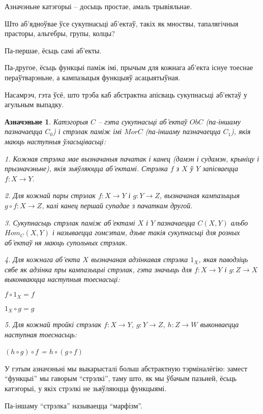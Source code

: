 \documentclass[a4paper,12pt]{book}
\newtheorem{definition}{Азначэньне}[section]
\begin{document}
Азначэньне катэгорыі -- досыць простае, амаль трывіяльнае.

Што аб'ядноўвае ўсе сукупнасьці аб'ектаў, такіх як мноствы,
тапалягічныя прасторы, альгебры, групы, колцы?

Па-першае, ёсьць самі аб'екты.

Па-другое, ёсьць функцыі паміж імі, прычым для кожнага аб'екта існуе
тоеснае пераўтварэньне, а кампазыцыя функцыяў асацыятыўная.

Насамрэч, гэта ўсё, што трэба каб абстрактна апісваць сукупнасьці
аб'ектаў у агульным выпадку.

\begin{definition}
  Катэгорыя $C$ -- гэта сукупнасьці аб'ектаў ${Ob C}$ (па-іншаму
  пазначаецца $C_0$) і стрэлак паміж
  імі ${Mor C}$ (па-іншаму пазначаецца $C_1$), якія  маюць наступныя
  ўласьцівасьці:

  1. Кожная стрэлка мае вызначаныя пачатак і канец (дамэн і судамэн,
  крыніцу і прызначэньне),
  якія зьяўляюцца аб'ектамі. Стрэлка $f$ з $X$ ў $Y$ запісваецца
  ${f:X\rightarrow Y}$.

  2. Для кожнай пары стрэлак ${f:X\rightarrow Y}$ і ${g:Y\rightarrow
    Z}$, вызначаная кампазыцыя ${g \circ f:X\rightarrow Z}$, калі канец першай
  супадае з пачаткам другой.

  3. Сукупнасьць стрэлак паміж аб'ектамі $X$ і $Y$ пазначаецца
  $C(X,Y)$ альбо $Hom_C(X, Y)$ і называецца гомсэтам, дзьве такія
  сукупнасьці для розных аб'ектаў ня маюць
  супольных стрэлак.

  4. Для кожнага аб'екта $X$ вызначаная адзінкавая стрэлка $1_X$, якая
  паводзіць сябе як адзінка пры кампазыцыі стрэлак, гэта значыць для
  ${f:X \rightarrow Y}$ і ${g:Z\rightarrow X}$ выконваюцца наступныя
  тоеснасьці:

  $f \circ 1_X = f$

  $1_X \circ g = g$

  5. Для кожнай тройкі стрэлак ${f: X\rightarrow Y}$, ${g:Y\rightarrow
    Z}$, ${h:Z\rightarrow W}$ выконваецца наступная тоеснасьць:

  $(h \circ g) \circ f$ = $h \circ (g \circ f)$
\end{definition}

У гэтым азначэньні мы выкарысталі больш абстрактную тэрміналёгію:
замест ``функцыі'' мы гаворым ``стрэлкі'', таму што, як мы ўбачым
пазьней, ёсьць катэгорыі, у якіх стрэлкі не зьяўляюцца функцыямі.

Па-іншаму ``стрэлка'' называецца ``марфізм''.
\end{document}
